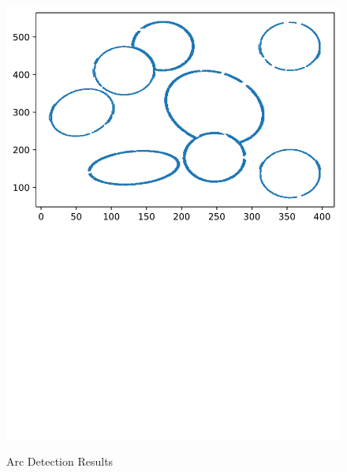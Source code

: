 \documentclass{beamer}
\begin{document}
\begin{frame}
\begin{columns}
\begin{column}{.5\linewidth}
\begin{figure}[htbp]
{                        \includegraphics[width=0.7\linewidth]{pic/arc_666.pdf}
                    }
                    \quad
                    \caption{Arc Detection Results}
                \end{figure}
            \end{column}
        \end{columns}
    
    \end{frame}
\end{document}
